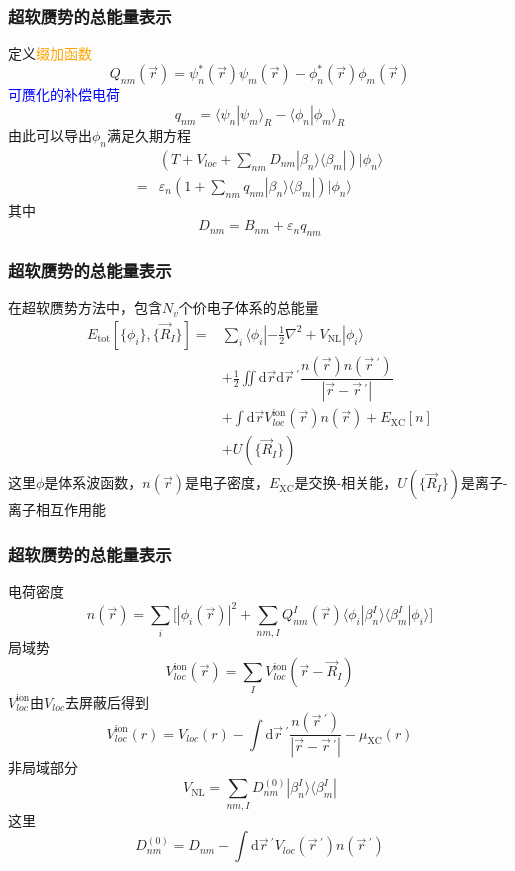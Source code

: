 \frame
{
	\frametitle{超软赝势的总能量表示}
	定义\textcolor{orange}{缀加函数}$$Q_{nm}(\vec r)=\psi_n^{\ast}(\vec r)\psi_m(\vec r)-\phi_n^{\ast}(\vec r)\phi_m(\vec r)$$
	\textcolor{blue}{可赝化的补偿电荷}$$q_{nm}=\langle\psi_n|\psi_m\rangle_R-\langle\phi_n|\phi_m\rangle_R$$
	由此可以导出$\phi_n$满足久期方程
	\begin{displaymath}
		\begin{aligned}
			&\left(T+V_{loc}+\sum_{nm}D_{nm}|\beta_n\rangle\langle\beta_m|\right)|\phi_n\rangle\\
			=&\varepsilon_n\left(1+\sum_{nm}q_{nm}|\beta_n\rangle\langle\beta_m|\right)|\phi_n\rangle
		\end{aligned}
	\end{displaymath}
	其中$$D_{nm}=B_{nm}+\varepsilon_nq_{nm}$$
}

\frame
{
	\frametitle{超软赝势的总能量表示}
	在超软赝势方法中，包含$N_v$个价电子体系的总能量%
	\begin{displaymath}
		\begin{aligned}
			E_{\mathrm{tot}}[\{\phi_i\},\{\vec R_I\}]=&\sum_i\langle\phi_i|-\frac12\nabla^2+V_{\mathrm{NL}}|\phi_i\rangle\\
			&+\frac12\iint\mathrm{d}\vec r\mathrm{d}\vec r\,^{\prime}\dfrac{n(\vec r)n(\vec r\,^{\prime})}{|\vec r-\vec r\,^{\prime}|}\\
			&+\int\mathrm{d}\vec r V_{loc}^{\mathrm{ion}}(\vec r)n(\vec r)+E_{\mathrm{XC}}[n]\\
			&+U(\{\vec R_I\})
		\end{aligned}
	\end{displaymath}
	这里$\phi$是体系波函数，$n(\vec r)$是电子密度，$E_{\mathrm{XC}}$是交换-相关能，$U(\{\vec R_I\})$是离子-离子相互作用能
}

\frame
{
	\frametitle{超软赝势的总能量表示}
	电荷密度$$n(\vec r)=\sum_i\big[|\phi_i(\vec r)|^2+\sum_{nm,I}Q_{nm}^I(\vec r)\langle\phi_i|\beta_n^I\rangle\langle\beta_m^I|\phi_i\rangle\big]$$
	局域势$$V_{loc}^{\mathrm{ion}}(\vec r)=\sum_IV_{loc}^{\mathrm{ion}}(\vec r-\vec R_I)$$
	$V_{loc}^{\mathrm{ion}}$由$V_{loc}$去屏蔽后得到$$V_{loc}^{\mathrm{ion}}(r)=V_{loc}(r)-\int\mathrm{d}\vec r\,^{\prime}\dfrac{n(\vec r\,^{\prime})}{|\vec r-\vec r\,^{\prime}|}-\mu_{\mathrm{XC}}(r)$$
	非局域部分$$V_{\mathrm{NL}}=\sum_{nm,I}D_{nm}^{(0)}|\beta_n^I\rangle\langle\beta_m^I|$$
	这里$$D_{nm}^{(0)}=D_{nm}-\int\mathrm{d}\vec r\,^{\prime}V_{loc}(\vec r\,^{\prime})n(\vec r\,^{\prime})$$
}

